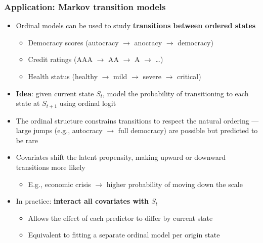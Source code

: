 
\begin{frame}
\frametitle{Application: Markov transition models}
\centering

\vspace{6pt}

\begin{itemize}[<+->]
\item Ordinal models can be used to study \textbf{transitions between ordered states}
  \begin{itemize}
  \item Democracy scores (autocracy $\to$ anocracy $\to$ democracy)
  \item Credit ratings (AAA $\to$ AA $\to$ A $\to$ \ldots)
  \item Health status (healthy $\to$ mild $\to$ severe $\to$ critical)
  \end{itemize}
\vspace{8pt}
\item \textbf{Idea}: given current state $S_t$, model the probability of transitioning to each state at $S_{t+1}$ using ordinal logit
\vspace{8pt}
\item The ordinal structure constrains transitions to respect the natural ordering --- large jumps (e.g., autocracy $\to$ full democracy) are possible but predicted to be rare
\vspace{8pt}
\item Covariates shift the latent propensity, making upward or downward transitions more likely
  \begin{itemize}
  \item E.g., economic crisis $\to$ higher probability of moving down the scale
  \end{itemize}
\vspace{8pt}
\item In practice: \textbf{interact all covariates with $S_t$}
  \begin{itemize}
  \item Allows the effect of each predictor to differ by current state
  \item Equivalent to fitting a separate ordinal model per origin state
  \end{itemize}
\end{itemize}

\end{frame}
